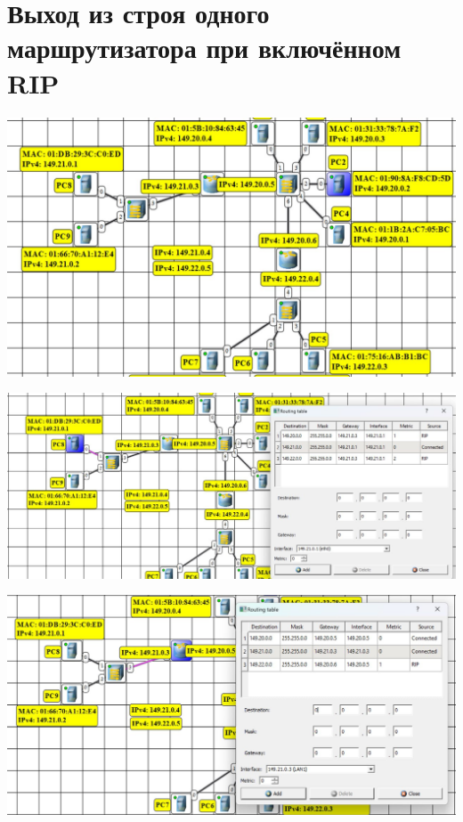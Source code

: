 \documentclass{article}
\begin{document}
\section*{Выход из строя одного маршрутизатора при включённом RIP}
\begin{center}
    \includegraphics[width=.9\textwidth]{3-8}
\end{center}
\begin{center}
    \includegraphics[width=.9\textwidth]{3-9}
\end{center}
\begin{center}
    \includegraphics[width=.9\textwidth]{4-0}
\end{center}
\end{document}
